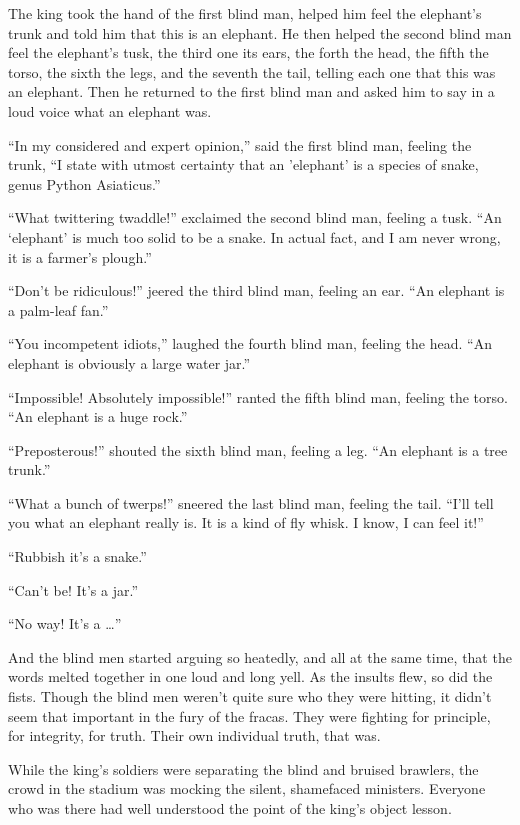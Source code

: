﻿\documentclass[11pt, openany]{book}
\begin{document}
The king took the hand of the first blind man, helped him feel the elephant’s trunk and told him that this is an elephant. He then helped the second blind man feel the elephant’s tusk, the third one its ears, the forth the head, the fifth the torso, the sixth the legs, and the seventh the tail, telling each one that this was an elephant. Then he returned to the first blind man and asked him to say in a loud voice what an elephant was.

“In my considered and expert opinion,” said the first blind man, feeling the trunk, “I state with utmost certainty that an ’elephant’ is a species of snake, genus Python Asiaticus.”

“What twittering twaddle!” exclaimed the second blind man, feeling a tusk. “An ‘elephant’ is much too solid to be a snake. In actual fact, and I am never wrong, it is a farmer’s plough.”

“Don’t be ridiculous!” jeered the third blind man, feeling an ear. “An elephant is a palm-leaf fan.”

“You incompetent idiots,” laughed the fourth blind man, feeling the head. “An elephant is obviously a large water jar.”

“Impossible! Absolutely impossible!” ranted the fifth blind man, feeling the torso. “An elephant is a huge rock.”

“Preposterous!” shouted the sixth blind man, feeling a leg. “An elephant is a tree trunk.”

“What a bunch of twerps!” sneered the last blind man, feeling the tail. “I’ll tell you what an elephant really is. It is a kind of fly whisk. I know, I can feel it!”

“Rubbish it’s a snake.”

“Can’t be! It’s a jar.”

“No way! It’s a …”

And the blind men started arguing so heatedly, and all at the same time, that the words melted together in one loud and long yell. As the insults flew, so did the fists. Though the blind men weren’t quite sure who they were hitting, it didn’t seem that important in the fury of the fracas. They were fighting for principle, for integrity, for truth. Their own individual truth, that was.

While the king’s soldiers were separating the blind and bruised brawlers, the crowd in the stadium was mocking the silent, shamefaced ministers. Everyone who was there had well understood the point of the king’s object lesson.
\end{document}
